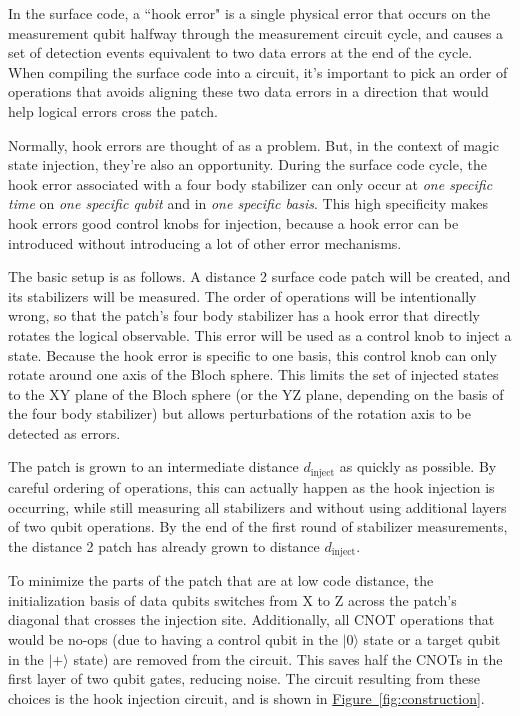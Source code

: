 \documentclass[onecolumn,unpublished,a4paper]{quantumarticle}
\theoremstyle{definition}
\theoremstyle{definition}
\theoremstyle{definition}
\newcommand{\fig}[1]{\hyperref[fig:#1]{Figure~\ref*{fig:#1}}}
\begin{document}
In the surface code, a ``hook error" is a single physical error that occurs on the measurement qubit halfway through the measurement circuit cycle, and causes a set of detection events equivalent to two data errors at the end of the cycle.
When compiling the surface code into a circuit, it's important to pick an order of operations that avoids aligning these two data errors in a direction that would help logical errors cross the patch.

Normally, hook errors are thought of as a problem.
But, in the context of magic state injection, they're also an opportunity.
During the surface code cycle, the hook error associated with a four body stabilizer can only occur at \emph{one specific time} on \emph{one specific qubit} and in \emph{one specific basis}.
This high specificity makes hook errors good control knobs for injection, because a hook error can be introduced without introducing a lot of other error mechanisms.

The basic setup is as follows.
A distance 2 surface code patch will be created, and its stabilizers will be measured.
The order of operations will be intentionally wrong, so that the patch's four body stabilizer has a hook error that directly rotates the logical observable.
This error will be used as a control knob to inject a state.
Because the hook error is specific to one basis, this control knob can only rotate around one axis of the Bloch sphere.
This limits the set of injected states to the XY plane of the Bloch sphere (or the YZ plane, depending on the basis of the four body stabilizer) but allows perturbations of the rotation axis to be detected as errors.

The patch is grown to an intermediate distance $d_\text{inject}$ as quickly as possible.
By careful ordering of operations, this can actually happen as the hook injection is occurring, while still measuring all stabilizers and without using additional layers of two qubit operations.
By the end of the first round of stabilizer measurements, the distance 2 patch has already grown to distance $d_\text{inject}$.

To minimize the parts of the patch that are at low code distance, the initialization basis of data qubits switches from X to Z across the patch's diagonal that crosses the injection site.
Additionally, all CNOT operations that would be no-ops (due to having a control qubit in the $|0\rangle$ state or a target qubit in the $|+\rangle$ state) are removed from the circuit.
This saves half the CNOTs in the first layer of two qubit gates, reducing noise.
The circuit resulting from these choices is the hook injection circuit, and is shown in \fig{construction}.
\end{document}
